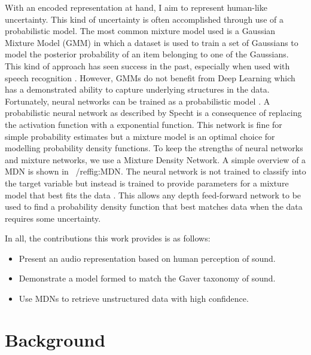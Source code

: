 With an encoded representation at hand, I aim to represent human-like uncertainty. This kind of uncertainty is often accomplished through use of a probabilistic model. The most common mixture model used is a Gaussian Mixture Model (GMM) in which a dataset is used to train a set of Gaussians to model the posterior probability of an item belonging to one of the Gaussians. This kind of approach has seen success in the past, especially when used with speech recognition \cite{Campbell1997}. However, GMMs do not benefit from Deep Learning which has a demonstrated ability to capture underlying structures in the data. Fortunately, neural networks can be trained as a probabilistic model \cite{Specht1990, bishop1994mixture}. A probabilistic neural network as described by Specht is a consequence of replacing the activation function with a exponential function. This network is fine for simple probability estimates but a mixture model is an optimal choice for modelling probability density functions. To keep the strengths of neural networks and mixture networks, we use a Mixture Density Network. A simple overview of a MDN is shown in ~/ref{fig:MDN}. The neural network is not trained to classify into the target variable but instead is trained to provide parameters for a mixture model that best fits the data \cite{bishop1994mixture}. This allows any depth feed-forward network to be used to find a probability density function that best matches data when the data requires some uncertainty.

In all, the contributions this work provides is as follows:
\begin{itemize}
    \item Present an audio representation based on human perception of sound.
    \item Demonstrate a model formed to match the Gaver taxonomy of sound.
    \item Use MDNs to retrieve unstructured data with high confidence.
\end{itemize}

\section{Background}
